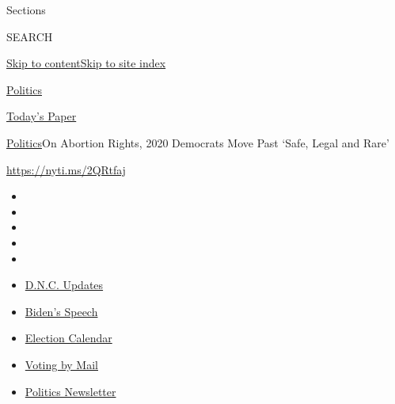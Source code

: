 Sections

SEARCH

\protect\hyperlink{site-content}{Skip to
content}\protect\hyperlink{site-index}{Skip to site index}

\href{https://www.nytimes3xbfgragh.onion/section/politics}{Politics}

\href{https://myaccount.nytimes3xbfgragh.onion/auth/login?response_type=cookie\&client_id=vi}{}

\href{https://www.nytimes3xbfgragh.onion/section/todayspaper}{Today's
Paper}

\href{/section/politics}{Politics}\textbar{}On Abortion Rights, 2020
Democrats Move Past `Safe, Legal and Rare'

\url{https://nyti.ms/2QRtfaj}

\begin{itemize}
\item
\item
\item
\item
\item
\end{itemize}

\begin{itemize}
\item
  \href{https://www.nytimes3xbfgragh.onion/live/2020/08/20/us/dnc-convention-election?action=click\&pgtype=Article\&state=default\&region=TOP_BANNER\&context=storylines_menu}{D.N.C.
  Updates}
\item
  \href{https://www.nytimes3xbfgragh.onion/2020/08/20/us/politics/biden-presidential-nomination-dnc.html?action=click\&pgtype=Article\&state=default\&region=TOP_BANNER\&context=storylines_menu}{Biden's
  Speech}
\item
  \href{https://www.nytimes3xbfgragh.onion/interactive/2019/us/elections/2020-presidential-election-calendar.html?action=click\&pgtype=Article\&state=default\&region=TOP_BANNER\&context=storylines_menu}{Election
  Calendar}
\item
  \href{https://www.nytimes3xbfgragh.onion/interactive/2020/08/11/us/politics/vote-by-mail-us-states.html?action=click\&pgtype=Article\&state=default\&region=TOP_BANNER\&context=storylines_menu}{Voting
  by Mail}
\item
  \href{https://www.nytimes3xbfgragh.onion/newsletters/politics?action=click\&pgtype=Article\&state=default\&region=TOP_BANNER\&context=storylines_menu}{Politics
  Newsletter}
\end{itemize}

